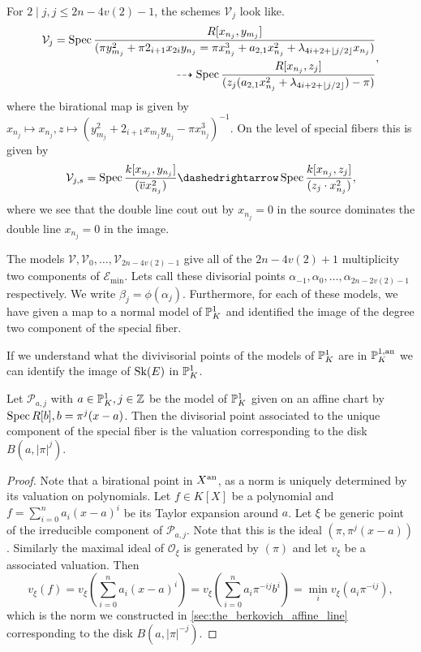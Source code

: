For $2 \mid j, j \le 2n - 4v(2) - 1$, the schemes $\mathcal{V} _j$ look like. 
\[
	\begin{aligned}
		\mathcal{V}_j = \operatorname{Spec} \frac{R[x_{n_j},y_{m_j}]}{(\pi y^2_{m_j} + \pi 2_{{i + 1}}x_{2i}y_{n_j} = \pi x_{n_j}^3 + a_{2,1}x_{n_j}^2 + \lambda_{4i + 2 + \left\lfloor j / 2 \right\rfloor} x_{n_j})} \\ \dashrightarrow \operatorname{Spec} \frac{R[ x_{n_j}, z_j]}{(z_j(a_{2,1} x_{n_j}^2 + \lambda_{4i + 2 + \left\lfloor j / 2 \right\rfloor})- \pi)} 
	\end{aligned}
,\]
where the birational map is given by $x_{n_j} \mapsto  x_{n_j}, z \mapsto (y^2_{m_j} + 2_{i + 1 }x_{m_j}y_{n_j} - \pi x_{n_j}^3)^{-1}$. 
On the level of special fibers this is given by \[
	\mathcal{V} _{j, s} = \spec \frac{k[x_{n_j}, y_{n_j}]}{(\overline{v}x^2_{n_j})} \birat \spec \frac{k[x_{n_j}, z_j]}{(z_j \cdot  x^2_{n_j})}
,\]
where we see that the double line cout out by  $x_{n_j} = 0$ in the source dominates the double line $x_{n_j} = 0$ in the image. 


\bigskip

The models $\mathcal{V} , \mathcal{V} _{0}, \ldots, \mathcal{V} _{2n - 4v(2) - 1}$ give all of the $2n - 4v(2) + 1$ multiplicity two components of  $\mathscr E_\text{min} $. 
Lets call these divisorial points $\alpha_{-1}, \alpha_0, \ldots, \alpha_{2n-2v(2) - 1}$ respectively. 
We write $\beta_j = \phi(\alpha_j)$. 
Furthermore, for each of these models, we have given a map to a normal model of $\mathbb{P}^{1}_{K}$  and identified the image of the degree two component of the special fiber. 

If we understand what the divivisorial points of the models of $\mathbb{P}^{1}_K$ are in $\mathbb{P}^{1, \text{an}}_K$ we can identify the image of  $\operatorname{Sk}(E)$ in $\mathbb{P}^{1}_K$. 

\begin{lemma}
	Let $\mathscr P_{a,j}$ with $a \in \mathbb{P}_K^{1}, j \in \mathbb{Z}$ be the model of $\mathscr {\mathbb{P}}_{K}^{1}$ given on an affine chart by $\operatorname{Spec} R[b], b = \pi^{j}(x - a)$.
	Then the divisorial point associated to the unique component of the special fiber is the valuation corresponding to the disk $B(a, |\pi|^{j})$. 
\end{lemma}
\begin{proof}
	Note that a birational point in $X{}^{\text{an}}$, as a norm is uniquely determined by its valuation on polynomials. 
	Let $f \in K[X]$ be a polynomial and $f = \sum_{i = 0}^{n} a_i (x - a)^{i} $ be its Taylor expansion around $a$. 
	Let $\xi$ be generic point of the irreducible component of $\mathscr P_{a, j}$. 
	Note that this is the ideal $(\pi, \pi^{j}(x-a))$.
	Similarly the maximal ideal of $\mathcal{O}_{\xi}$ is generated by $(\pi)$ and let $v_{\xi}$ be a associated valuation.
	Then \[
		v_\xi(f) = v_\xi\left( \sum_{i = 0}^{n} a_{i} (x-a)^{i} \right) = v_\xi\left( \sum_{i = 0}^{n} a_i\pi^{-ij}b^{i} \right) = \min_{i} v_{\xi}(a_i \pi^{-ij}) 
	,\]
	which is the norm we constructed in \cref{sec:the_berkovich_affine_line} corresponding to the disk $B(a, |\pi|^{-j})$.
\end{proof}

